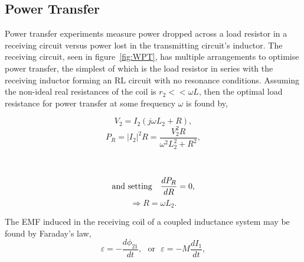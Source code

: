 \documentclass[11pt]{iopart}
\begin{document}


\subsection{Power Transfer}
Power transfer experiments measure power dropped across a load
resistor in a receiving circuit versus power lost in the transmitting
circuit's inductor. The receiving circuit, seen in
figure~\ref{fig:WPT}, has multiple arrangements to optimise power
transfer, the simplest of which is the load resistor in series with
the receiving inductor forming an RL circuit with no resonance conditions. Assuming the non-ideal
real resistances of the coil is $r_2 << \omega L$, then the optimal
load resistance for power transfer at some frequency $\omega$ is found
by,
\begin{center}
\begin{minipage}{0.4\linewidth}
\begin{equation}
  V_2 = I_2 (j\omega L_2 + R),  
\end{equation}
\begin{equation}
  P_R = |I_2|^2R = \frac{V_2^2R}{\omega^2L_2^2 + R^2},
  \label{eqn:RL-max-theory}
\end{equation}
\end{minipage}
~~
\vrule
\begin{minipage}{0.4\linewidth}
  $$\text{and setting\quad} \frac{dP_R}{dR} = 0,$$ 
\begin{equation}
  \Rightarrow R = \omega L_2.
  \label{eqn:RL-max}
\end{equation}
\end{minipage}
\end{center}
\vspace{0.2em}
The EMF induced in the receiving coil of a coupled inductance system
may be found by Faraday's law,
\vspace{-0.5em}
\begin{equation}
  \varepsilon = -\frac{d\phi_{21}}{dt},~~~\text{or}~~~\varepsilon = -M\frac{dI_{1}}{dt},
  \label{eqn:M}
\end{equation}
\end{document}
